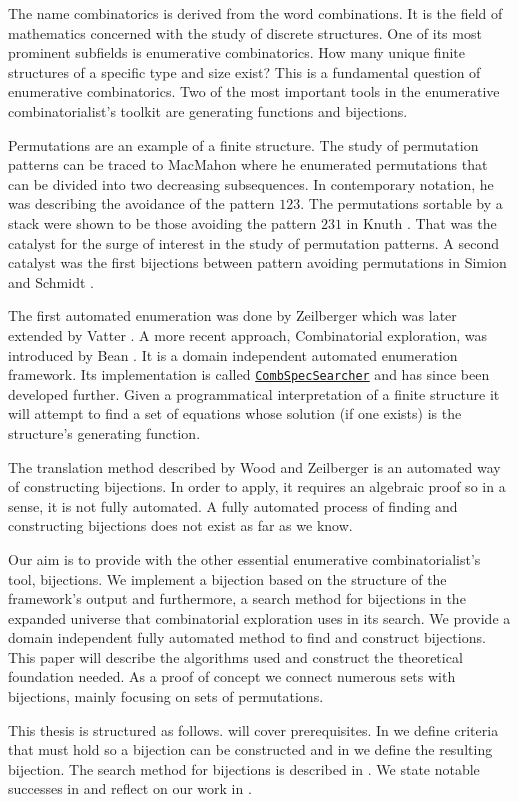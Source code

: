 \label{ch:introduction}
The name combinatorics is derived from the word combinations. It is the field of mathematics concerned with the study of discrete structures. One of its most prominent subfields is enumerative combinatorics. How many unique finite structures of a specific type and size exist? This is a fundamental question of enumerative combinatorics. Two of the most important tools in the enumerative combinatorialist's toolkit are generating functions and bijections.

Permutations are an example of a finite structure. The study of permutation patterns can be traced to MacMahon \cite{MacMahon} where he enumerated permutations that can be divided into two decreasing subsequences. In contemporary notation, he was describing the avoidance of the pattern $123$. The permutations sortable by a stack were shown to be those avoiding the pattern $231$ in Knuth \cite{knuth:aocp1}. That was the catalyst for the surge of interest in the study of permutation patterns. A second catalyst was the first bijections between pattern avoiding permutations in Simion and Schmidt \cite{simionandschmidt}. 

The first automated enumeration was done by Zeilberger \cite{Zeilberger1998EnumerationSA} which was later extended by Vatter \cite{vatter_2008}. A more recent approach, Combinatorial exploration, was introduced by Bean \cite{BeanPhd:phd}. It is a domain independent automated enumeration framework. Its implementation is called \href{https://github.com/PermutaTriangle/comb_spec_searcher}{\texttt{CombSpecSearcher}} and has since been developed further. Given a programmatical interpretation of a finite structure it will attempt to find a set of equations whose solution (if one exists) is the structure's generating function.

The translation method described by Wood and Zeilberger \cite{wood_zeilberger} is an automated way of constructing bijections. In order to apply, it requires an algebraic proof so in a sense, it is not fully automated. A fully automated process of finding and constructing bijections does not exist as far as we know.

Our aim is to provide \css{} with the other essential enumerative combinatorialist's tool, bijections. We implement a bijection based on the structure of the framework's output and furthermore, a search method for bijections in the expanded universe that combinatorial exploration uses in its search. We provide a domain independent fully automated method to find and construct bijections. This paper will describe the algorithms used and construct the theoretical foundation needed. As a proof of concept we connect numerous sets with bijections, mainly focusing on sets of permutations.

This thesis is structured as follows.  will cover prerequisites. In  we define criteria that must hold so a bijection can be constructed and in  we define the resulting bijection. The search method for bijections is described in . We state notable successes in  and reflect on our work in .
